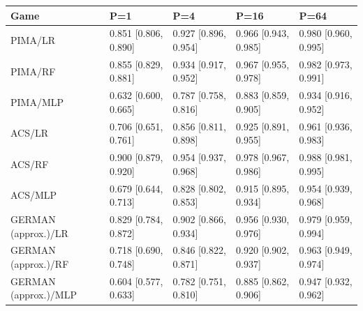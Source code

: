 \begingroup\footnotesize\setlength{\tabcolsep}{3pt}
\begin{tabular}{lllll}
\toprule
Game & P=1 & P=4 & P=16 & P=64 \\
\midrule
PIMA/LR & 0.851 [0.806, 0.890] & 0.927 [0.896, 0.954] & 0.966 [0.943, 0.985] & 0.980 [0.960, 0.995] \\
PIMA/RF & 0.855 [0.829, 0.881] & 0.934 [0.917, 0.952] & 0.967 [0.955, 0.978] & 0.982 [0.973, 0.991] \\
PIMA/MLP & 0.632 [0.600, 0.665] & 0.787 [0.758, 0.816] & 0.883 [0.859, 0.905] & 0.934 [0.916, 0.952] \\
ACS/LR & 0.706 [0.651, 0.761] & 0.856 [0.811, 0.898] & 0.925 [0.891, 0.955] & 0.961 [0.936, 0.983] \\
ACS/RF & 0.900 [0.879, 0.920] & 0.954 [0.937, 0.968] & 0.978 [0.967, 0.986] & 0.988 [0.981, 0.995] \\
ACS/MLP & 0.679 [0.644, 0.713] & 0.828 [0.802, 0.853] & 0.915 [0.895, 0.934] & 0.954 [0.939, 0.968] \\
GERMAN (approx.)/LR & 0.829 [0.784, 0.872] & 0.902 [0.866, 0.934] & 0.956 [0.930, 0.976] & 0.979 [0.959, 0.994] \\
GERMAN (approx.)/RF & 0.718 [0.690, 0.748] & 0.846 [0.822, 0.871] & 0.920 [0.902, 0.937] & 0.963 [0.949, 0.974] \\
GERMAN (approx.)/MLP & 0.604 [0.577, 0.633] & 0.782 [0.751, 0.810] & 0.885 [0.862, 0.906] & 0.947 [0.932, 0.962] \\
\bottomrule
\end{tabular}
\endgroup
